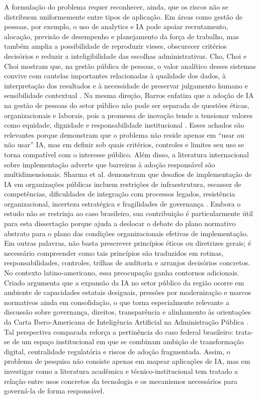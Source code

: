 \documentclass[12pt,a4paper]{article}
\begin{document}
A formulação do problema requer reconhecer, ainda, que os riscos não se distribuem uniformemente entre tipos de aplicação. Em áreas como gestão de pessoas, por exemplo, o uso de analytics e IA pode apoiar recrutamento, alocação, previsão de desempenho e planejamento da força de trabalho, mas também amplia a possibilidade de reproduzir vieses, obscurecer critérios decisórios e reduzir a inteligibilidade das escolhas administrativas. Cho, Choi e Choi mostram que, na gestão pública de pessoas, o valor analítico desses sistemas convive com cautelas importantes relacionadas à qualidade dos dados, à interpretação dos resultados e à necessidade de preservar julgamento humano e sensibilidade contextual \autocite{cho2023human}. Na mesma direção, Barros enfatiza que a adoção de IA na gestão de pessoas do setor público não pode ser separada de questões éticas, organizacionais e laborais, pois a promessa de inovação tende a tensionar valores como equidade, dignidade e responsabilidade institucional \autocite{barros2025inteligencia}. Esses achados são relevantes porque demonstram que o problema não reside apenas em “usar ou não usar” IA, mas em definir sob quais critérios, controles e limites seu uso se torna compatível com o interesse público.
Além disso, a literatura internacional sobre implementação adverte que barreiras à adoção responsável são multidimensionais. Sharma et al. demonstram que desafios de implementação de IA em organizações públicas incluem restrições de infraestrutura, escassez de competências, dificuldades de integração com processos legados, resistência organizacional, incerteza estratégica e fragilidades de governança \autocite{sharma2021implementing}. Embora o estudo não se restrinja ao caso brasileiro, sua contribuição é particularmente útil para esta dissertação porque ajuda a deslocar o debate do plano normativo abstrato para o plano das condições organizacionais efetivas de implementação. Em outras palavras, não basta prescrever princípios éticos ou diretrizes gerais; é necessário compreender como tais princípios são traduzidos em rotinas, responsabilidades, controles, trilhas de auditoria e arranjos decisórios concretos.
No contexto latino-americano, essa preocupação ganha contornos adicionais. Criado argumenta que a expansão da IA no setor público da região ocorre em ambiente de capacidades estatais desiguais, pressões por modernização e marcos normativos ainda em consolidação, o que torna especialmente relevante a discussão sobre governança, direitos, transparência e alinhamento às orientações da Carta Ibero-Americana de Inteligência Artificial na Administração Pública \autocite{criado2024inteligencia}. Tal perspectiva comparada reforça a pertinência do caso federal brasileiro: trata-se de um espaço institucional em que se combinam ambição de transformação digital, centralidade regulatória e riscos de adoção fragmentada. Assim, o problema de pesquisa não consiste apenas em mapear aplicações de IA, mas em investigar como a literatura acadêmica e técnico-institucional tem tratado a relação entre usos concretos da tecnologia e os mecanismos necessários para governá-la de forma responsável.
\end{document}
